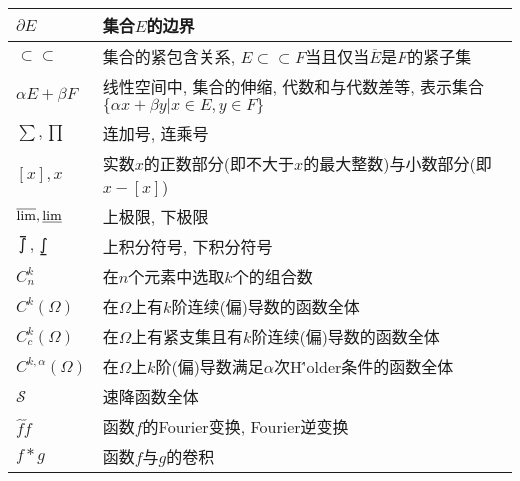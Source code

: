 \begin{longtable}{ll}
\(\partial E\)&集合\(E\)的边界\\\hline
\(\subset\subset\)&集合的紧包含关系, \(E\subset\subset F\)当且仅当\(\overline{E}\)是\(F\)的紧子集\\\hline
\(\alpha E+\beta F\)&线性空间中, 集合的伸缩, 代数和与代数差等, 表示集合\(\{\alpha x+\beta y\big|x\in E,y\in F\}\)\\\hline
\(\sum,\prod\)&连加号, 连乘号\\\hline
\([x],{x}\)&实数\(x\)的正数部分(即不大于\(x\)的最大整数)与小数部分(即\(x-[x]\))\\\hline
\(\varlimsup,\varliminf\)&上极限, 下极限\\\hline
\(\upint,\lowint\)&上积分符号, 下积分符号\phantom{\Large\(\int\)}\\\hline
\(C_n^k\)&在\(n\)个元素中选取\(k\)个的组合数\\\hline
\(C^k(\Omega)\)&在\(\Omega\)上有\(k\)阶连续(偏)导数的函数全体\\\hline
\(C_c^k(\Omega)\)&在\(\Omega\)上有紧支集且有\(k\)阶连续(偏)导数的函数全体\\\hline
\(C^{k,\alpha}(\Omega)\)&在\(\Omega\)上\(k\)阶(偏)导数满足\(\alpha\)次H\''{o}lder条件的函数全体\\\hline
\(\mathscr{S} \)&速降函数全体\\\hline
\(\hat{f}\check{f}\)&函数\(f\)的Fourier变换, Fourier逆变换\\\hline
\(f*g\)&函数\(f\)与\(g\)的卷积\\\hline
\end{longtable}





